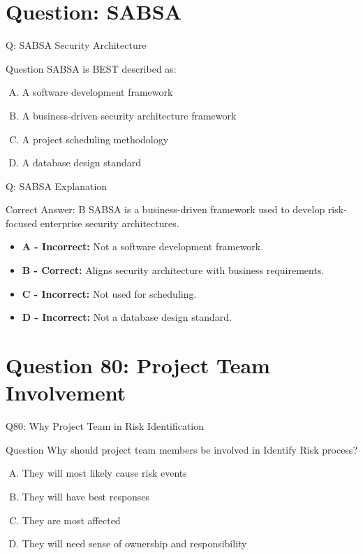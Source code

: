 \documentclass{beamer}
\begin{document}
	\section{Question: SABSA}
	
	\begin{frame}{Q: SABSA Security Architecture}
		\begin{block}{Question}
			SABSA is BEST described as:
		\end{block}
		
		\begin{enumerate}[(A)]
			\item A software development framework
			\item A business-driven security architecture framework
			\item A project scheduling methodology
			\item A database design standard
		\end{enumerate}
	\end{frame}
	
	\begin{frame}{Q: SABSA Explanation}
		\begin{block}{Correct Answer: B}
			SABSA is a business-driven framework used to develop
			risk-focused enterprise security architectures.
		\end{block}
		
		\begin{itemize}
			\item \textbf{A - Incorrect:} Not a software development framework.
			\item \textbf{B - Correct:} Aligns security architecture with business requirements.
			\item \textbf{C - Incorrect:} Not used for scheduling.
			\item \textbf{D - Incorrect:} Not a database design standard.
		\end{itemize}
	\end{frame}
	
	
	
	
	
	
	\section{Question 80: Project Team Involvement}
	
	\begin{frame}{Q80: Why Project Team in Risk Identification}
		\begin{block}{Question}
			Why should project team members be involved in Identify Risk process?
		\end{block}
		\begin{enumerate}[(A)]
			\item They will most likely cause risk events
			\item They will have best responses
			\item They are most affected
			\item They will need sense of ownership and responsibility
		\end{enumerate}
	\end{frame}
	
\end{document}
